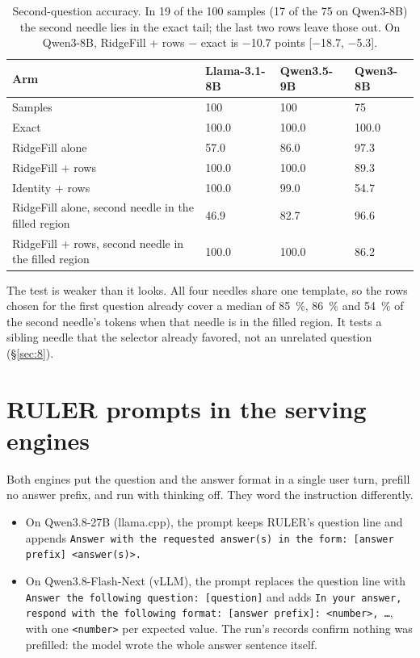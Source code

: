\documentclass[11pt]{article}
\begin{document}
\begin{table}[H]
\centering
\caption{Second-question accuracy. In 19 of the 100 samples (17 of the 75 on Qwen3-8B) the second needle lies in the exact tail; the last two rows leave those out. On Qwen3-8B, RidgeFill + rows $-$ exact is $-$10.7 points [$-$18.7, $-$5.3].}\label{tab:D.1}
\small
\setlength{\tabcolsep}{4pt}
\begin{tabular}{llll}
\toprule
Arm & Llama-3.1-8B & Qwen3.5-9B & Qwen3-8B \\
\midrule
Samples & 100 & 100 & 75 \\
Exact & 100.0 & 100.0 & 100.0 \\
RidgeFill alone & 57.0 & 86.0 & 97.3 \\
RidgeFill + rows & 100.0 & 100.0 & 89.3 \\
Identity + rows & 100.0 & 99.0 & 54.7 \\
RidgeFill alone, second needle in the filled region & 46.9 & 82.7 & 96.6 \\
RidgeFill + rows, second needle in the filled region & 100.0 & 100.0 & 86.2 \\
\bottomrule
\end{tabular}
\end{table}

The test is weaker than it looks. All four needles share one template, so the rows chosen for the first question already cover a median of 85~\%, 86~\% and 54~\% of the second needle's tokens when that needle is in the filled region. It tests a sibling needle that the selector already favored, not an unrelated question (\S\ref{sec:8}).


\section{RULER prompts in the serving engines}\label{app:E}
Both engines put the question and the answer format in a single user turn, prefill no answer prefix, and run with thinking off. They word the instruction differently.

\begin{itemize}[leftmargin=*,itemsep=2pt,topsep=4pt]
\item On Qwen3.8-27B (llama.cpp), the prompt keeps RULER's question line and appends \texttt{Answer with the requested answer(s) in the form:\allowbreak{} [answer prefix] \textless{}answer(s)\textgreater{}.\allowbreak{}}
\item On Qwen3.8-Flash-Next (vLLM), the prompt replaces the question line with \texttt{Answer the following question:\allowbreak{} [question]} and adds \texttt{In your answer, respond with the following format:\allowbreak{} [answer prefix]:\allowbreak{} \textless{}number\textgreater{}, \ldots{}}, with one \texttt{\textless{}number\textgreater{}} per expected value. The run's records confirm nothing was prefilled: the model wrote the whole answer sentence itself.
\end{itemize}
\end{document}

